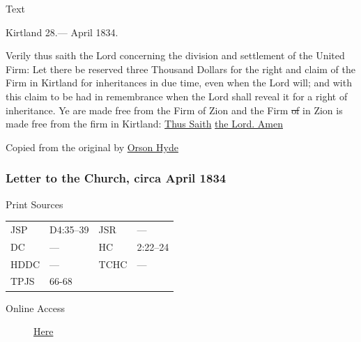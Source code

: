 				\begin{description}
					\item[Text]
				\end{description}
				
					\begin{tightright}
					Kirtland 28.--- April 1834.
					\end{tightright}
					
					Verily thus saith the Lord concerning the division and settlement of the United Firm: Let there be reserved three Thousand Dollars for the right and claim of the Firm in Kirtland for inheritances in due time, even when the Lord will; and with this claim to be had in remembrance when the Lord shall reveal it for a right of inheritance. Ye are made free from the Firm of Zion and the Firm \sout{of} in Zion is made free from the firm in Kirtland: \uline{Thus Saith} \uline{the Lord. Amen}
					
					Copied from the original by \uline{Orson Hyde}
					
		\subsubsection{Letter to the Church, circa April 1834}
			\label{EMS-1834-JS-CIR-APR-1834}
			
			\begin{description}
					\item[Print Sources]
				\end{description}

					\begin{tabular}{p{0.5in}p{1in}p{0.5in}p{1in}}
					JSP	 	& D4:35--39		& JSR 		& --- \\
					DC	 	& --- 		& HC 		& 2:22--24 \\
					HDDC 	& ---		& TCHC 		& --- \\
					TPJS 	& 66-68 	&  &  \\
					\end{tabular}
				
				\begin{description}
					\item[Online Access] \href{https://www.josephsmithpapers.org/paper-summary/letter-to-the-church-circa-april-1834/1}{Here}
				\end{description}
				
